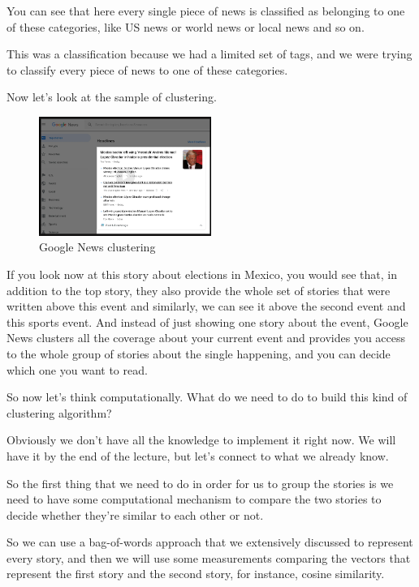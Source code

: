 \documentclass[a4paper, 12pt]{article}
\begin{document}
You can see that here every single piece of news is classified as belonging to
one of these categories, like US news or world news or local news and so on.

This was a classification because we had a limited set of tags, and we were
trying to classify every piece of news to one of these categories.

Now let's look at the sample of clustering.

\begin{figure}[H]
\centering
\includegraphics[width=0.5\textwidth]{./pic/google-news-clustering.png}
\caption{\label{fig:orgdbbdb87}Google News clustering}
\end{figure}

If you look now at this story about elections in Mexico, you would see that, in
addition to the top story, they also provide the whole set of stories that were
written above this event and similarly, we can see it above the second event and
this sports event. And instead of just showing one story about the event, Google
News clusters all the coverage about your current event and provides you access
to the whole group of stories about the single happening, and you can decide
which one you want to read.

So now let's think computationally. What do we need to do to build this kind of
clustering algorithm?

Obviously we don't have all the knowledge to implement it right now. We will
have it by the end of the lecture, but let's connect to what we already know.

So the first thing that we need to do in order for us to group the stories is we
need to have some computational mechanism to compare the two stories to decide
whether they're similar to each other or not.

So we can use a bag-of-words approach that we extensively discussed to represent
every story, and then we will use some measurements comparing the vectors that
represent the first story and the second story, for instance, cosine similarity.
\end{document}
